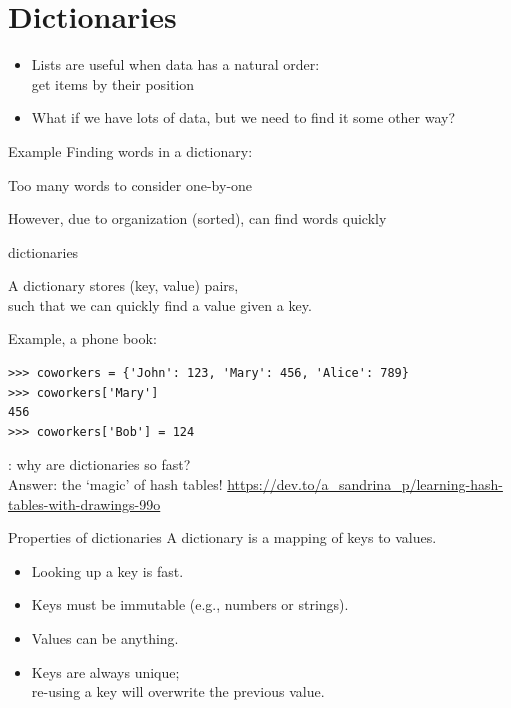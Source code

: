 \documentclass[aspectratio=169,usenames,dvipsnames]{beamer}
\begin{document}
\section{Dictionaries}
\frame{\tableofcontents[currentsection]}

\begin{frame}
    \begin{itemize}
        \item Lists are useful when data has a natural order: \\
            get items by their position
        \pause
        \item What if we have lots of data,
            but we need to find it some other way?
    \end{itemize}

    \begin{block}{Example}
    Finding words in a dictionary:

    Too many words to consider one-by-one

    However, due to organization (sorted), can find words quickly
    \end{block}
\end{frame}


\begin{frame}[fragile]{dictionaries}
    \begin{definition}
        A dictionary stores (key, value) pairs, \\
        such that we can quickly find a value given a key.
    \end{definition}
Example, a phone book:
\begin{lstlisting}
>>> coworkers = {'John': 123, 'Mary': 456, 'Alice': 789}
>>> coworkers['Mary']
456
>>> coworkers['Bob'] = 124
\end{lstlisting}

\vspace{1em}
: why are dictionaries so fast?\\
Answer: the `magic' of hash tables!
\url{https://dev.to/a_sandrina_p/learning-hash-tables-with-drawings-99o}
\end{frame}

\begin{frame}{Properties of dictionaries}
A dictionary is a mapping of keys to values.

    \begin{itemize}
        \item Looking up a key is fast.
        \item Keys must be immutable (e.g., numbers or strings).
        \item Values can be anything.
        \item Keys are always unique; \\
            re-using a key will overwrite the previous value.
    \end{itemize}
\end{frame}
\end{document}
